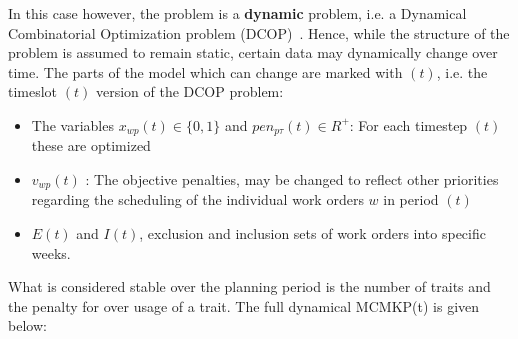 \documentclass[preprint,12pt,authoryear]{elsarticle}
\begin{document}
In this case however, the problem is a \textbf{dynamic} problem, i.e. a Dynamical Combinatorial Optimization problem (DCOP)~\cite{yang2013metaheuristics}. Hence, while the structure of the problem is assumed to remain static, certain data may dynamically change over time. The parts of the model which can change are marked with $(t)$, i.e. the timeslot $(t)$ version of the DCOP problem:

\begin{itemize}
\item The variables $x_{wp}(t) \in \{0,1\}$ and $pen_{p\tau}(t) \in R^+$: For each timestep $(t)$ these are optimized
\item $v_{wp}(t)$ : The objective penalties, may be changed to reflect other priorities regarding the scheduling of the individual work orders $w$ in period $(t)$
\item $E(t)$ and $I(t)$, exclusion and inclusion sets of work orders into specific weeks. 
\end{itemize}

What is considered stable over the planning period is the number of traits and the penalty for over usage of a trait. The full dynamical MCMKP(t) is given below:

\end{document}
